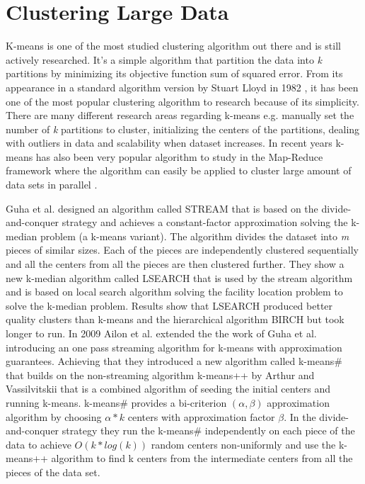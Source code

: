 \section{Clustering Large Data}
K-means is one of the most studied clustering algorithm out there and is still actively researched. It's a simple algorithm that partition the data into \textit{k} partitions by minimizing its objective function sum of squared error. From its appearance in a standard algorithm version by Stuart Lloyd in 1982 \citep{Lloyd:1982}, it has been one of the most popular clustering algorithm to research because of its simplicity. There are many different research areas regarding k-means e.g. manually set the number of \textit{k} partitions to cluster, initializing the centers of the partitions, dealing with outliers in data and scalability when dataset increases. In recent years k-means has also been very popular algorithm to study in the Map-Reduce framework where the algorithm can easily be applied to cluster large amount of data sets in parallel \citep{Dean:2004}.

Guha et al. \citep{Guha:2003} designed an algorithm called STREAM that is based on the divide-and-conquer strategy and achieves a constant-factor approximation solving the k-median problem (a k-means variant). The algorithm divides the dataset into \textit{m} pieces of similar sizes. Each of the pieces are independently clustered sequentially and all the centers from all the pieces are then clustered further. They show a new k-median algorithm called LSEARCH that is used by the stream algorithm and is based on local search algorithm solving the facility location problem \citep{Charikar:1999} to solve the k-median problem. Results show that LSEARCH produced better quality clusters than k-means and the hierarchical algorithm BIRCH \citep{Zhang:1996} but took longer to run. In 2009 Ailon et al. \citep{Ailon:2009} extended the the work of Guha et al. introducing an one pass streaming algorithm for k-means with approximation guarantees. Achieving that they introduced a new algorithm called k-means\# that builds on the non-streaming algorithm k-means++ by Arthur and Vassilvitskii \citep{Arthur:2007} that is a combined algorithm of seeding the initial centers and running k-means. k-means\# provides a bi-criterion $ (\alpha,\beta) $ approximation algorithm by choosing $\alpha * k $ centers with approximation factor $\beta$. In the divide-and-conquer strategy they run the k-means\# independently on each piece of the data to achieve $O(k * log(k))$ random centers non-uniformly and use the k-means++ algorithm to find k centers from the intermediate centers from all the pieces of the data set. 

